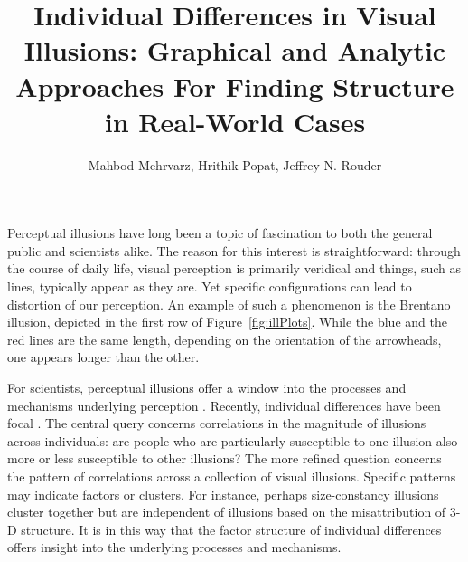 \documentclass[man, 12pt]{apa7} %
\title{Individual Differences in Visual Illusions: Graphical and Analytic Approaches For Finding Structure in Real-World Cases}
\author{Mahbod Mehrvarz, Hrithik Popat, Jeffrey N. Rouder}
\affiliation{{University of California, Irvine}}
\begin{document}
\maketitle



Perceptual illusions have long been a topic of fascination to both the general public and scientists alike. The reason for this interest is straightforward: through the course of daily life, visual perception is primarily veridical and things, such as lines, typically appear as they are. Yet specific configurations can lead to distortion of our perception. An example of such a phenomenon is the Brentano illusion, depicted in the first row of Figure~\ref{fig:illPlots}. While the blue and the red lines are the same length, depending on the orientation of the arrowheads, one appears longer than the other. 

For scientists, perceptual illusions offer a window into the processes and mechanisms underlying perception \parencite[]{Coren.Girgus.2020}. Recently, individual differences have been focal \parencite[see][]{Tulver.2019}. The central query concerns correlations in the magnitude of illusions across individuals: are people who are particularly susceptible to one illusion also more or less susceptible to other illusions? The more refined question concerns the pattern of correlations across a collection of visual illusions.  Specific patterns may indicate factors or clusters.  For instance, perhaps size-constancy illusions cluster together but are independent of illusions based on the misattribution of 3-D structure. It is in this way that the factor structure of individual differences offers insight into the underlying processes and mechanisms. 
\end{document}
